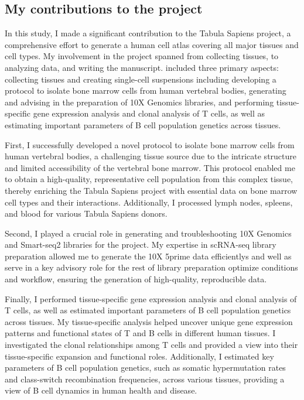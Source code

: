 \subsection{My contributions to the project}
In this study, I made a significant contribution to the Tabula Sapiens project, a comprehensive effort to generate a human cell atlas covering all major tissues and cell types. My involvement in the project spanned from collecting tissues, to analyzing data,  and writing the manuscript. included three primary aspects: collecting tissues and creating single-cell suspensions including developing a protocol to isolate bone marrow cells from human vertebral bodies, generating and advising in the preparation of 10X Genomics libraries, and performing tissue-specific gene expression analysis and clonal analysis of T cells, as well as estimating important parameters of B cell population genetics across tissues.

First, I successfully developed a novel protocol to isolate bone marrow cells from human vertebral bodies, a challenging tissue source due to the intricate structure and limited accessibility of the vertebral bone marrow. This protocol enabled me to obtain a high-quality, representative cell population from this complex tissue, thereby enriching the Tabula Sapiens project with essential data on bone marrow cell types and their interactions. Additionally, I processed lymph nodes, spleens, and blood for various Tabula Sapiens donors.

Second, I played a crucial role in generating and troubleshooting 10X Genomics and Smart-seq2 libraries for the project. My expertise in scRNA-seq library preparation allowed me to generate the 10X 5prime data efficientlys and well as serve in a key advisory role for the rest of library preparation optimize conditions and workflow, ensuring the generation of high-quality, reproducible data.

Finally, I performed tissue-specific gene expression analysis and clonal analysis of T cells, as well as estimated important parameters of B cell population genetics across tissues. My tissue-specific analysis helped uncover unique gene expression patterns and functional states of T and B cells in different human tissues. I investigated the clonal relationships among T cells and provided a view into their tissue-specific expansion and functional roles. Additionally, I estimated key parameters of B cell population genetics, such as somatic hypermutation rates and class-switch recombination frequencies, across various tissues, providing a view of B cell dynamics in human health and disease. 


